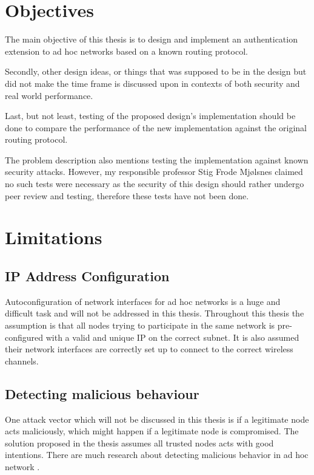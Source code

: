 \section{Objectives}
The main objective of this thesis is to design and implement an authentication
extension to ad hoc networks based on a known routing protocol.

Secondly, other design ideas, or things that was supposed to be in the design
but did not make the time frame is discussed upon in contexts of both security
and real world performance.

Last, but not least, testing of the proposed design's implementation should be
done to compare the performance of the new implementation against the original
routing protocol.

The problem description also mentions testing the implementation against known
security attacks. However, my responsible professor Stig Frode Mj{\o}lsnes
claimed no such tests were necessary as the security of this design should
rather undergo peer review and testing, therefore these tests have not been
done.

\section{Limitations}

\subsection{IP Address Configuration}
\label{limit:ip_address_conf}
Autoconfiguration of network interfaces for ad hoc networks is a huge and
difficult task and will not be addressed in this thesis. Throughout this thesis
the assumption is that all nodes trying to participate in the same network is
pre-configured with a valid and unique IP on the correct subnet. It is also
assumed their network interfaces are correctly set up to connect to the correct
wireless channels.

\subsection{Detecting malicious behaviour}
\label{limit:malicious_behaviour}
One attack vector which will not be discussed in this thesis is if a legitimate
node acts maliciously, which might happen if a legitimate node is compromised.
The solution proposed in the thesis assumes all trusted nodes acts with good
intentions. There are much research about detecting malicious behavior in ad
hoc network \cite{Pirzada_McDonald} \cite{dhurandher2010network}.

